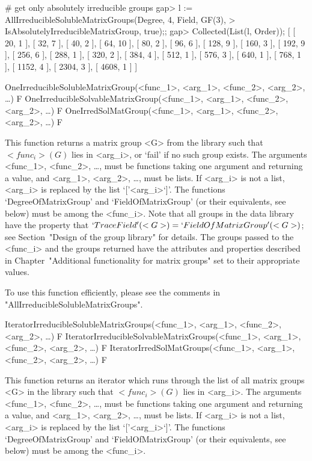 # get only absolutely irreducible groups
gap> l := AllIrreducibleSolubleMatrixGroups(Degree, 4, Field, GF(3),
> IsAbsolutelyIrreducibleMatrixGroup, true);;
gap> Collected(List(l, Order));
[ [ 20, 1 ], [ 32, 7 ], [ 40, 2 ], [ 64, 10 ], [ 80, 2 ], [ 96, 6 ], 
  [ 128, 9 ], [ 160, 3 ], [ 192, 9 ], [ 256, 6 ], [ 288, 1 ], [ 320, 2 ], 
  [ 384, 4 ], [ 512, 1 ], [ 576, 3 ], [ 640, 1 ], [ 768, 1 ], [ 1152, 4 ], 
  [ 2304, 3 ], [ 4608, 1 ] ]
\endexample

\>OneIrreducibleSolubleMatrixGroup(<func_1>, <arg_1>, <func_2>, <arg_2>, \dots) F
\>OneIrreducibleSolvableMatrixGroup(<func_1>, <arg_1>, <func_2>, <arg_2>, \dots) F
\>OneIrredSolMatGroup(<func_1>, <arg_1>, <func_2>, <arg_2>, \dots) F

This function returns a matrix group <G> from the {\IRREDSOL} library such that
$<func_i>(G)$ lies in <arg_i>, or `fail' if no such group exists. The arguments <func_1>,
<func_2>, \dots, must be {\GAP} functions taking one argument and returning a value, and
<arg_1>, <arg_2>, \dots,  must be lists. If <arg_i> is not a list, <arg_i> is replaced by
the list `['<arg_i>`]'. The functions `DegreeOfMatrixGroup' and `FieldOfMatrixGroup' (or their equivalents, see below) must be among the <func_i>. 
 Note that all groups in the data library have the property that 
$`TraceField'(<G>) = `FieldOfMatrixGroup'(<G>)$; see Section~"Design of the group library" 
for details. 
The groups passed to the <func_i> and the groups returned have the attributes and properties described in 
Chapter~"Additional functionality for matrix groups" set to their appropriate values.

To use this function efficiently, please see the comments in 
"AllIrreducibleSolubleMatrixGroups".


\>IteratorIrreducibleSolubleMatrixGroups(<func_1>, <arg_1>, <func_2>, <arg_2>, \dots) F
\>IteratorIrreducibleSolvableMatrixGroups(<func_1>, <arg_1>, <func_2>, <arg_2>, \dots) F
\>IteratorIrredSolMatGroups(<func_1>, <arg_1>, <func_2>, <arg_2>, \dots) F

This function returns an iterator which runs through the list of all matrix groups <G>
in the  {\IRREDSOL} library such that
$<func_i>(G)$ lies in <arg_i>. The arguments <func_1>, <func_2>, \dots,
must be {\GAP} functions taking one argument and returning a value, and <arg_1>, <arg_2>, \dots, 
must be lists. If <arg_i> is not a list, <arg_i> is replaced by the list `['<arg_i>`]'.
The functions `DegreeOfMatrixGroup' and `FieldOfMatrixGroup' (or their equivalents, see below) must be among the <func_i>. 


